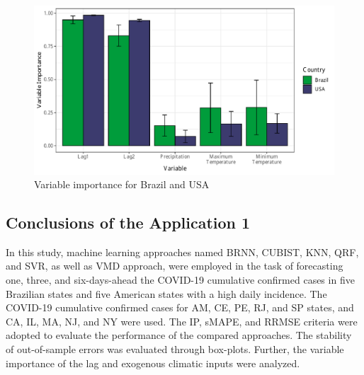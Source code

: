 \begin{figure}[htb!]
    \centering
    \includegraphics[width=0.8\linewidth]{Media/cs1_importance.pdf}
    \caption{Variable importance for Brazil and USA}
    \label{fig:importance}
\end{figure}

\subsection{Conclusions of the Application 1 \label{CONC}}

In this study, machine learning approaches named \ac{BRNN}, \ac{CUBIST}, \ac{KNN}, \ac{QRF}, and \ac{SVR}, as well as \ac{VMD} approach, were employed in the task of forecasting one, three, and six-days-ahead the \ac{COVID-19} cumulative confirmed cases in five Brazilian states and five American states with a high daily incidence. The \ac{COVID-19} cumulative confirmed cases for \ac{AM}, \ac{CE}, \ac{PE}, \ac{RJ}, and \ac{SP} states, and \ac{CA}, \ac{IL}, \ac{MA}, \ac{NJ}, and \ac{NY} were used. The \ac{IP}, \ac{sMAPE}, and \ac{RRMSE} criteria were adopted to evaluate the performance of the compared approaches. The stability of out-of-sample errors was evaluated through box-plots. Further, the variable importance of the lag and exogenous climatic inputs were analyzed.


